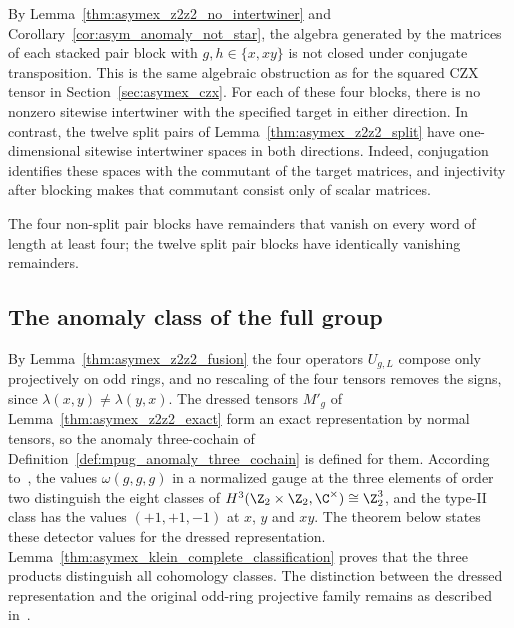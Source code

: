 \begin{remark}%
    \label{rem:asymex_z2z2_anomaly}
    By Lemma~\ref{thm:asymex_z2z2_no_intertwiner} and
    Corollary~\ref{cor:asym_anomaly_not_star}, the algebra generated
    by the matrices of each stacked pair block with
    $g,h\in\{x,xy\}$ is not closed under conjugate transposition.
    This is the same algebraic obstruction as for the squared CZX
    tensor in Section~\ref{sec:asymex_czx}.
    For each of these four blocks, there is no nonzero sitewise
    intertwiner with the specified target in either direction.
    In contrast, the twelve split pairs of
    Lemma~\ref{thm:asymex_z2z2_split} have one-dimensional
    sitewise intertwiner spaces in both directions.
    Indeed, conjugation identifies these spaces with the commutant
    of the target matrices, and injectivity after blocking makes
    that commutant consist only of scalar matrices.
\end{remark}

\begin{remark}%
    \label{rem:asymex_z2z2_scope}
    The four non-split pair blocks have remainders that vanish on
    every word of length at least four; the twelve split pair blocks
    have identically vanishing remainders.
\end{remark}

\subsection{The anomaly class of the full group}%
\label{sec:asymex_z2z2_anomaly}

By Lemma~\ref{thm:asymex_z2z2_fusion} the four operators $U_{g,L}$
compose only projectively on odd rings, and no rescaling of the four
tensors removes the signs, since $\lambda(x,y)\neq\lambda(y,x)$. The
dressed tensors $M'_g$ of Lemma~\ref{thm:asymex_z2z2_exact} form an
exact representation by normal tensors, so the anomaly three-cochain of
Definition~\ref{def:mpug_anomaly_three_cochain} is defined for them.
According to~\cite{GarreRubio2023MPOSym}, the values
$\omega(g,g,g)$ in a normalized gauge at the three elements of order two
distinguish the eight classes of
$H^3(\Z_2\times\Z_2,\C^\times)\cong\Z_2^3$, and the type-II class has the
values $(+1,+1,-1)$ at $x$, $y$ and $xy$. The theorem below states these
detector values for the dressed representation.
Lemma~\ref{thm:asymex_klein_complete_classification} proves that the three
products distinguish all cohomology classes. The distinction between the dressed
representation and the original odd-ring projective family remains as described
in~\cite{gap:glm23_z2z2_anomaly_detector_scope}.

